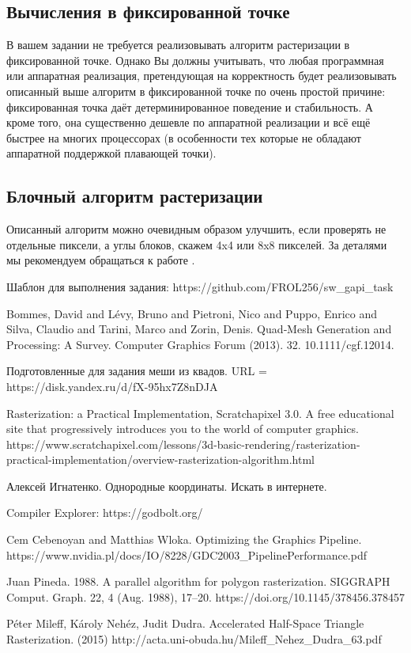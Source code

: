 \documentclass[12pt,subf,href,colorlinks=true]{article}
\begin{document}
\subsection{Вычисления в фиксированной точке}

В вашем задании не требуется реализовывать алгоритм растеризации в фиксированной точке. Однако Вы должны учитывать, что любая программная или аппаратная реализация, претендующая на корректность будет реализовывать описанный выше алгоритм в фиксированной точке по очень простой причине: фиксированная точка даёт детерминированное поведение и стабильность. А кроме того, она существенно дешевле по аппаратной реализации и всё ещё быстрее на многих процессорах (в особенности тех которые не обладают аппаратной поддержкой плавающей точки). 

\subsection{Блочный алгоритм растеризации}

Описанный алгоритм можно очевидным образом улучшить, если проверять не отдельные пиксели, а углы блоков, скажем 4x4 или 8x8 пикселей. За деталями мы рекомендуем обращаться к работе \cite{Mileff2015AcceleratedHT}. 


\begin{thebibliography}{9} 
	
 Шаблон для выполнения задания: https://github.com/FROL256/sw\_gapi\_task 

 Bommes, David and Lévy, Bruno and Pietroni, Nico and Puppo, Enrico and Silva, Claudio and Tarini, Marco and Zorin, Denis. Quad‐Mesh Generation and Processing: A Survey. Computer Graphics Forum (2013). 32. 10.1111/cgf.12014. 

 Подготовленные для задания меши из квадов. \newline URL = https://disk.yandex.ru/d/fX-95hx7Z8nDJA 

 Rasterization: a Practical Implementation, Scratchapixel 3.0. A free educational site that progressively introduces you to the world of computer graphics. https://www.scratchapixel.com/lessons/3d-basic-rendering/rasterization-practical-implementation/overview-rasterization-algorithm.html

 Алексей Игнатенко. Однородные координаты. Искать в интернете.

 Compiler Explorer: https://godbolt.org/

 Cem Cebenoyan and Matthias Wloka. Optimizing the Graphics Pipeline. https://www.nvidia.pl/docs/IO/8228/GDC2003\_PipelinePerformance.pdf

 Juan Pineda. 1988. A parallel algorithm for polygon rasterization. SIGGRAPH Comput. Graph. 22, 4 (Aug. 1988), 17–20. https://doi.org/10.1145/378456.378457

 Péter Mileff, Károly Nehéz, Judit Dudra.  Accelerated Half-Space Triangle Rasterization. (2015) http://acta.uni-obuda.hu/Mileff\_Nehez\_Dudra\_63.pdf

\end{thebibliography} 
\end{document}
